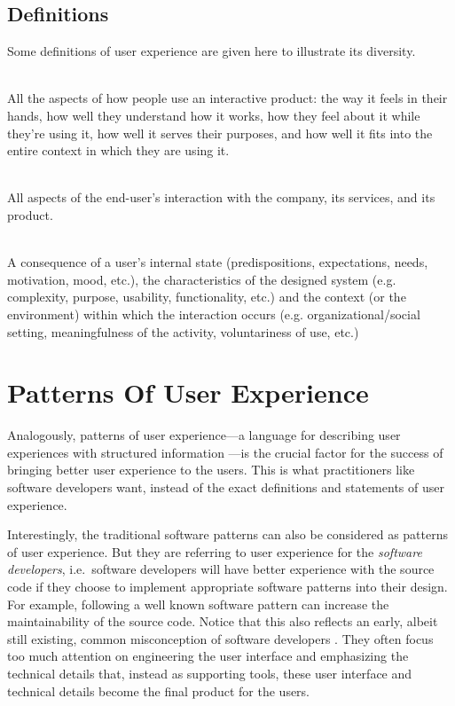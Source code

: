 \documentclass{acm_proc_article-sp}
\begin{document}
\subsection{Definitions}
Some definitions of user experience are given here to illustrate its
diversity.
\begin{description*}
  \item[\citet{experience:alben}] \hfill \\
    All the aspects of how people use an interactive product: the way
    it feels in their hands, how well they understand how it works,
    how they feel about it while they're using it, how well it serves
    their purposes, and how well it fits into the entire context in
    which they are using it.

  \item[\citet{experience:nielsen}] \hfill \\
    All aspects of the end-user's interaction with the company, its
    services, and its product.

  \item[\citet{ux:hassenzahl}] \hfill \\
    A consequence of a user's internal state (predispositions,
    expectations, needs, motivation, mood, etc.), the characteristics
    of the designed system (e.g. complexity, purpose, usability,
    functionality, etc.) and the context (or the environment) within
    which the interaction occurs (e.g. organizational/social setting,
    meaningfulness of the activity, voluntariness of use, etc.)
\end{description*}


\section{Patterns Of User Experience}
\label{sec:pux}
Analogously, patterns of user experience---a language for describing
user experiences with structured information
\citep{pux:blackwell}---is the crucial factor for the success of
bringing better user experience to the users. This is what
practitioners like software developers want, instead of the exact
definitions and statements of user experience.

Interestingly, the traditional software patterns can also be
considered as patterns of user experience. But they are referring to
user experience for the \textit{software developers}, i.e.\ software
developers will have better experience with the source code if they
choose to implement appropriate software patterns into their
design. For example, following a well known software pattern can
increase the maintainability of the source code. Notice that this also
reflects an early, albeit still existing, common misconception of
software developers \citep{pux:blackwell}. They often focus too much
attention on engineering the user interface and emphasizing the
technical details that, instead as supporting tools, these user
interface and technical details become the final product for the
users.
\end{document}
